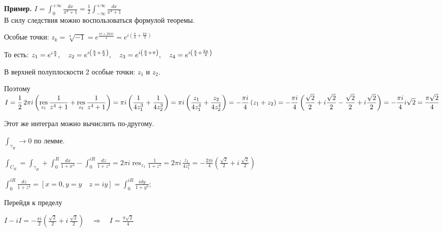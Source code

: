 \documentclass[a4paper, 12pt]{report}
\DeclareMathOperator*{\res}{res}
\begin{document}
\par\bigskip
\textbf{Пример.}
    $\displaystyle I=\int_0^{+\infty} \frac{dx}{x^4+1}=\frac{1}{2}\int_{-\infty}^{+\infty} \frac{dx}{x^4+1}$ \\
    
    В силу следствия можно воспользоваться формулой теоремы. \par\bigskip
    Особые точки: $\displaystyle z_k=\sqrt[4]{-1} = e^{\frac{i\pi+2k\pi i}{4}} = e^{i \left(\frac{\pi}{4}+\frac{k\pi}{2}\right)}$ \par
    То есть: $z_1=e^{i {\pi \over 4}}, \quad z_2=e^{i \left(\frac{\pi}{4} + \frac{\pi}{2}\right)}, \quad
    z_3=e^{i \left(\frac{\pi}{4} + \pi\right)}, \quad z_4=e^{i \left(\frac{\pi}{4} + \frac{3\pi}{2}\right)}$ \par
    В верхней полуплоскости 2 особые точки: $z_1$ и $z_2$.\par\bigskip
    Поэтому $\displaystyle I={1 \over 2} \, 2\pi i \left(\res_{z_1} \frac{1}{z^4+1} + \res_{z_2} \frac{1}{z^4+1}\right) = 
    \pi i \left(\frac{1}{4z_1^3} + \frac{1}{4z_2^3}\right) = \pi i \left(\frac{z_1}{4z_1^4} + \frac{z_2}{4z_2^4}\right) = 
    -\frac{\pi i}{4} \left(z_1 + z_2\right) = -\frac{\pi i}{4} \left(\frac{\sqrt{2}}{2} + i\frac{\sqrt{2}}{2} - \frac{\sqrt{2}}{2} + i\frac{\sqrt{2}}{2}\right) = 
    -\frac{\pi i}{4} i \sqrt{2} = \frac{\pi \sqrt{2}}{4}$
    \par\bigskip
    Этот же интеграл можно вычислить по-другому. \\
    \begin{center}
    \end{center}
    \par
    $\displaystyle \int_{\gamma_R} \to 0$ по лемме. \par
    $\displaystyle \int_{C_R} = \int_{\gamma_R} + \int_0^R \frac{dx}{1+x^4} - \int_0^{iR} \frac{dz}{1+z^4} = 
    2 \pi i \res_{z_1} \frac{1}{1+z^4} = 2\pi i \, \frac{z_1}{4z_1^4} = -\frac{2\pi i}{4} \left(\frac{\sqrt 2}{2} + i \, \frac{\sqrt 2}{2}\right)$ \par
    $\displaystyle \int_0^{iR} \frac{dz}{1+z^4} = \left[x=0, y=y \quad z=iy\right] = \int_0^{iR} \frac{idy}{1+y^4};$ \par\bigskip
    Перейдя к пределу \par
    $\displaystyle I-iI = -\frac{\pi i}{2} \left(\frac{\sqrt 2}{2} + i \, \frac{\sqrt 2}{2}\right) \quad \Rightarrow \quad I=\frac{\pi\sqrt 2}{4}$
\end{document}
